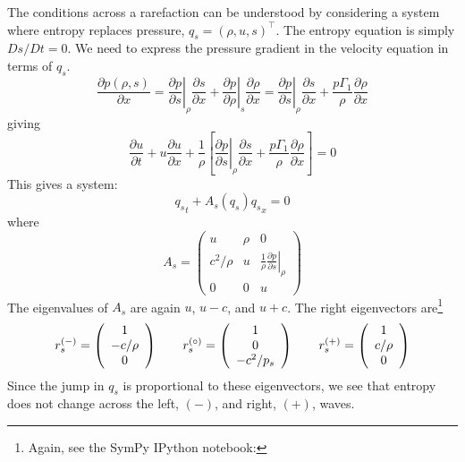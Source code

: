 The conditions across a rarefaction can be understood by considering
a system where entropy replaces pressure, $q_s = (\rho, u, s)^\intercal$.
The entropy equation is simply $Ds/Dt = 0$.  We need to express the
pressure gradient in the velocity equation in terms of $q_s$.
\begin{equation}
\frac{\partial p(\rho, s)}{\partial x} =
  \left . \frac{\partial p}{\partial s} \right |_\rho \frac{\partial s}{\partial x} +
  \left . \frac{\partial p}{\partial \rho} \right |_s \frac{\partial \rho}{\partial x}
=
  \left . \frac{\partial p}{\partial s} \right |_\rho \frac{\partial s}{\partial x} +
  \frac{p\Gamma_1}{\rho} \frac{\partial \rho}{\partial x}
\end{equation}
giving
\begin{equation}
\frac{\partial u}{\partial t} + u \frac{\partial u}{\partial x} + \frac{1}{\rho} \left [
     \left . \frac{\partial p}{\partial s} \right |_\rho \frac{\partial s}{\partial x} +
          \frac{p\Gamma_1}{\rho} \frac{\partial \rho}{\partial x} \right ] = 0
\end{equation}
This gives a system:
\begin{equation}
{q_s}_t + A_s(q_s) {q_s}_x = 0
\end{equation}
where
\begin{equation}
A_s =
 \left ( \begin{array}{ccc} u & \rho & 0 \\
        c^2/\rho & u & \frac{1}{\rho} \left . \frac{\partial p}{\partial s}\right |_\rho \\
        0 & 0 & u \end{array} \right )
\end{equation}
The eigenvalues of $A_s$ are again $u$, $u-c$, and $u+c$.  The right eigenvectors
are\footnote{Again, see the {\sf SymPy} {\sf IPython} notebook:
}
\begin{align}
r_s^\evm = \left ( \begin{array}{c} 1 \\ -c/\rho \\ 0 \end{array} \right )
%
\qquad
r_s^\evz = \left ( \begin{array}{c} 1 \\ 0 \\ -c^2/p_s  \end{array} \right )
%
\qquad
r_s^\evp = \left ( \begin{array}{c} 1 \\ c/\rho \\ 0 \end{array} \right )
\end{align}
Since the jump in $q_s$ is proportional to these eigenvectors, we see that
entropy does not change across the left, $(-)$, and right, $(+)$, waves.


